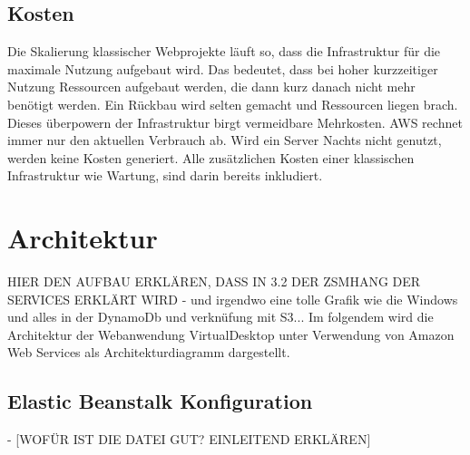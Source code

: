 \documentclass[a4paper, 12pt]{scrreprt}
\renewcommand\_{\textunderscore\allowbreak}
\begin{document}
\section{Kosten}
Die Skalierung klassischer Webprojekte läuft so, dass die Infrastruktur für die maximale Nutzung aufgebaut wird. Das bedeutet, dass bei hoher kurzzeitiger Nutzung Ressourcen aufgebaut werden, die dann kurz danach nicht mehr benötigt werden. Ein Rückbau wird selten gemacht und Ressourcen liegen brach.\\
Dieses überpowern der Infrastruktur birgt vermeidbare Mehrkosten. AWS rechnet immer nur den aktuellen Verbrauch ab. Wird ein Server Nachts nicht genutzt, werden keine Kosten generiert. Alle zusätzlichen Kosten einer klassischen Infrastruktur wie Wartung, sind darin bereits inkludiert. 
\chapter{Architektur}
HIER DEN AUFBAU ERKLÄREN, DASS IN 3.2 DER ZSMHANG DER SERVICES ERKLÄRT WIRD
- und irgendwo eine tolle Grafik wie die Windows und alles in der DynamoDb und verknüfung mit S3...
Im folgendem wird die Architektur der Webanwendung VirtualDesktop unter Verwendung von Amazon Web Services als Architekturdiagramm dargestellt.
\\


\section{Elastic Beanstalk Konfiguration}
- [WOFÜR IST DIE DATEI GUT? EINLEITEND ERKLÄREN]
\end{document}
